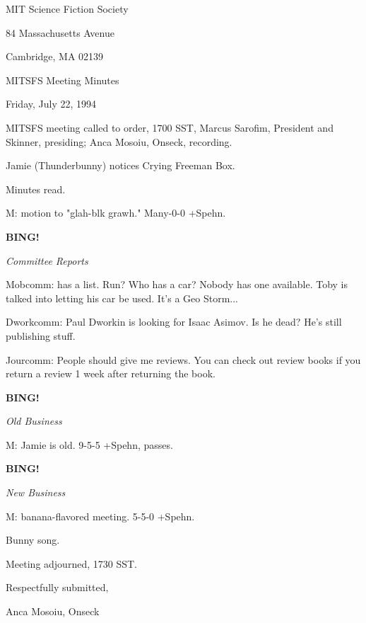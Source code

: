 \documentclass[12pt]{article}
\newcommand{\bing}{{\bf BING!} }
\newcommand{\goto}[1]{\bing \vskip 12pt \centerline{{\em{#1}}}}
\begin{document}
\begin{center}

MIT Science Fiction Society 

84 Massachusetts Avenue

Cambridge, MA 02139

\vspace{12pt}

MITSFS Meeting Minutes 

Friday, July 22, 1994

\end{center}
 
\vspace{18pt}

\setlength{\parskip}{6pt}

\noindent
MITSFS meeting called to order, 1700 SST,
Marcus Sarofim, President and Skinner, presiding; Anca Mosoiu, Onseck, recording.

Jamie (Thunderbunny) notices Crying Freeman Box.

Minutes read.

M: motion to "glah-blk grawh." Many-0-0 +Spehn.

\goto{Committee Reports}

Mobcomm: has a list. Run? Who has a car? Nobody has one available. Toby is talked into letting his car be used. It's a Geo Storm...

Dworkcomm: Paul Dworkin is looking for Isaac Asimov. Is he dead? He's still publishing stuff.

Jourcomm: People should give me reviews. You can check out review books if you return a review 1 week after returning the book.

\goto{Old Business}

M: Jamie is old. 9-5-5 +Spehn, passes.

\goto{New Business}

M: banana-flavored meeting. 5-5-0 +Spehn.

Bunny song.

\vspace{12pt}

\noindent
Meeting adjourned, 1730 SST.

\vspace{18pt}

\centerline{Respectfully submitted,}
\centerline{Anca Mosoiu, Onseck}
\end{document}
